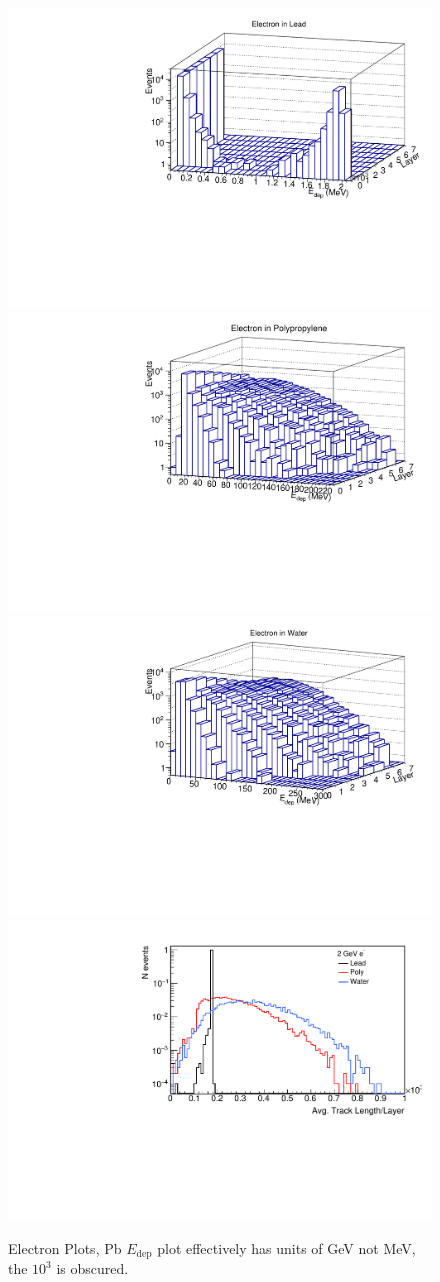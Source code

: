 \documentclass[aps,prd,twocolumn,nofootinbib]{revtex4-1}
\begin{document}
\begin{figure}
  \includegraphics[width=.45\textwidth]{plots/electron_pb_edep.pdf}
  \includegraphics[width=.45\textwidth]{plots/electron_pp_edep.pdf}
  \includegraphics[width=.45\textwidth]{plots/electron_h2o_edep.pdf}
  \includegraphics[width=.45\textwidth]{plots/TL_electron.pdf}
  \caption{Electron Plots, Pb $E_{\text{dep}}$ plot effectively has units of GeV not MeV, the $10^3$ is obscured.}
  \label{fig:e-quant}
\end{figure}
\end{document}
